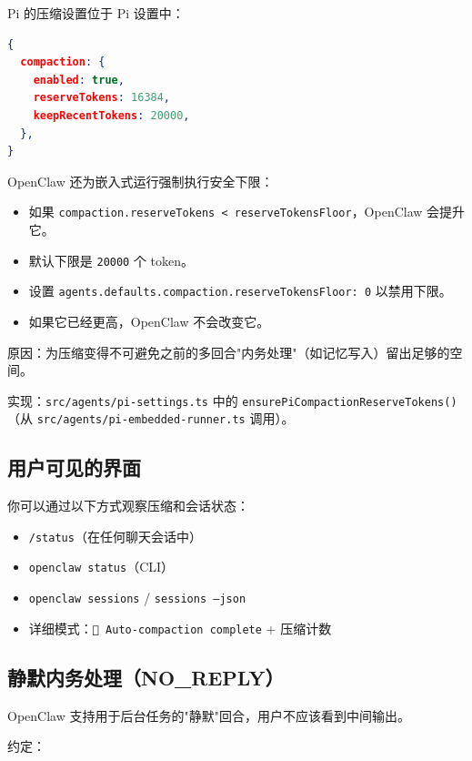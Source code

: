 Pi 的压缩设置位于 Pi 设置中：

\begin{lstlisting}[language=json]
{
  compaction: {
    enabled: true,
    reserveTokens: 16384,
    keepRecentTokens: 20000,
  },
}
\end{lstlisting}


OpenClaw 还为嵌入式运行强制执行安全下限：

\begin{itemize}
  \item 如果 \texttt{compaction.reserveTokens < reserveTokensFloor}，OpenClaw 会提升它。
  \item 默认下限是 \texttt{20000} 个 token。
  \item 设置 \texttt{agents.defaults.compaction.reserveTokensFloor: 0} 以禁用下限。
  \item 如果它已经更高，OpenClaw 不会改变它。
\end{itemize}


原因：为压缩变得不可避免之前的多回合"内务处理"（如记忆写入）留出足够的空间。

实现：\texttt{src/agents/pi-settings.ts} 中的 \texttt{ensurePiCompactionReserveTokens()}（从 \texttt{src/agents/pi-embedded-runner.ts} 调用）。

\hrulefill


\subsection{用户可见的界面}


你可以通过以下方式观察压缩和会话状态：

\begin{itemize}
  \item \texttt{/status}（在任何聊天会话中）
  \item \texttt{openclaw status}（CLI）
  \item \texttt{openclaw sessions} / \texttt{sessions --json}
  \item 详细模式：\texttt{🧹 Auto-compaction complete} + 压缩计数
\end{itemize}


\hrulefill


\subsection{静默内务处理（NO\_REPLY）}


OpenClaw 支持用于后台任务的"静默"回合，用户不应该看到中间输出。

约定：

